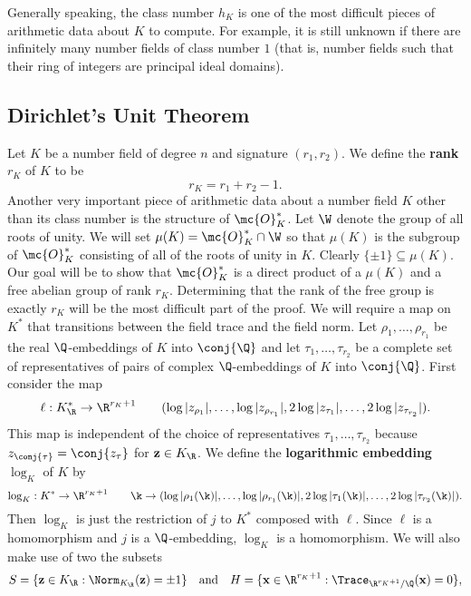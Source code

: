       Generally speaking, the class number $h_{K}$ is one of the most difficult pieces of arithmetic data about $K$ to compute. For example, it is still unknown if there are infinitely many number fields of class number $1$ (that is, number fields such that their ring of integers are principal ideal domains).
    \subsection*{Dirichlet's Unit Theorem}
      Let $K$ be a number field of degree $n$ and signature $(r_{1},r_{2})$. We define the \textbf{rank} $r_{K}$ of $K$ to be
      \[
        r_{K} = r_{1}+r_{2}-1.
      \]
      Another very important piece of arithmetic data about a number field $K$ other than its class number is the structure of $\mc{O}_{K}^{\ast}$. Let $\W$ denote the group of all roots of unity. We will set $\mu(K) = \mc{O}_{K}^{\ast} \cap \W$ so that $\mu(K)$ is the subgroup of $\mc{O}_{K}^{\ast}$ consisting of all of the roots of unity in $K$. Clearly $\{\pm 1\} \subseteq \mu(K)$. Our goal will be to show that $\mc{O}_{K}^{\ast}$ is a direct product of a $\mu(K)$ and a free abelian group of rank $r_{K}$. Determining that the rank of the free group is exactly $r_{K}$ will be the most difficult part of the proof. We will require a map on $K^{\ast}$ that transitions between the field trace and the field norm. Let $\rho_{1},\ldots,\rho_{r_{1}}$ be the real $\Q$-embeddings of $K$ into $\conj{\Q}$ and let $\tau_{1},\ldots,\tau_{r_{2}}$ be a complete set of representatives of pairs of complex $\Q$-embeddings of $K$ into $\conj{\Q}$. First consider the map
      \[
        \ell:K_{\R}^{\ast} \to \R^{r_{K}+1} \qquad (\log|z_{\rho_{1}}|,\ldots,\log|z_{\rho_{r_{1}}}|,2\log|z_{\tau_{1}}|,\ldots,2\log|z_{\tau_{r_{2}}}|).
      \]
      This map is independent of the choice of representatives $\tau_{1},\ldots,\tau_{r_{2}}$ because $z_{\conj{\tau}} = \conj{z_{\tau}}$ for $\mathbf{z} \in K_{\R}$.
      We define the \textbf{logarithmic embedding} $\log_{K}$ of $K$ by
      \[
        \log_{K}:K^{\ast} \to \R^{r_{K}+1} \qquad \k \to (\log|\rho_{1}(\k)|,\ldots,\log|\rho_{r_{1}}(\k)|,2\log|\tau_{1}(\k)|,\ldots,2\log|\tau_{r_{2}}(\k)|).
      \]
      Then $\log_{K}$ is just the restriction of $j$ to $K^{\ast}$ composed with $\ell$. Since $\ell$ is a homomorphism and $j$ is a $\Q$-embedding, $\log_{K}$ is a homomorphism. We will also make use of two the subsets
      \[
        S = \{\mathbf{z} \in K_{\R}:\Norm_{K_{\R}}(\mathbf{z}) = \pm 1\} \quad \text{and} \quad H = \{\mathbf{x} \in \R^{r_{K}+1}:\Trace_{\R^{r_{K}+1}/\Q}(\mathbf{x}) = 0\},
      \]

